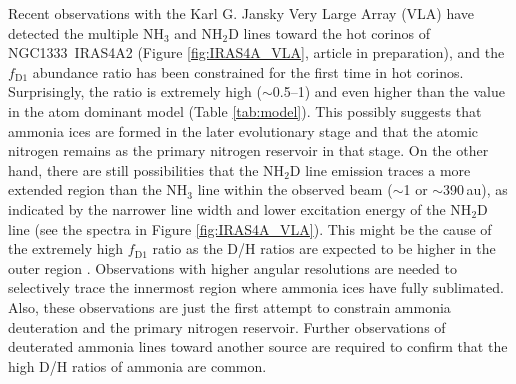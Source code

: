 \documentclass[12pt,a4paper]{article}  %
\newcommand{\ammonia}{NH$_3$\xspace}
\begin{document}
Recent observations with the Karl G. Jansky Very Large Array (VLA) have detected the multiple \ammonia and NH$_2$D lines toward the hot corinos of NGC1333~IRAS4A2 (Figure \ref{fig:IRAS4A_VLA}, article in preparation), and the $f_\mathrm{D1}$ abundance ratio has been constrained for the first time in hot corinos. Surprisingly, the ratio is extremely high ($\sim$0.5--1) and even higher than the value in the atom dominant model (Table \ref{tab:model}). This possibly suggests that ammonia ices are formed in the later evolutionary stage and that the atomic nitrogen remains as the primary nitrogen reservoir in that stage. On the other hand, there are still possibilities that the NH$_2$D line emission traces a more extended region than the NH$_3$ line within the observed beam ($\sim$1 or $\sim$390\,au), as indicated by the narrower line width and lower excitation energy of the NH$_2$D line (see the spectra in Figure \ref{fig:IRAS4A_VLA}). This might be the cause of the extremely high $f_\mathrm{D1}$ ratio as the D/H ratios are expected to be higher in the outer region \citep{Furuya18}. Observations with higher angular resolutions are needed to selectively trace the innermost region where ammonia ices have fully sublimated. Also, these observations are just the first attempt to constrain ammonia deuteration and the primary nitrogen reservoir. Further observations of deuterated ammonia lines toward another source are required to confirm that the high D/H ratios of ammonia are common. 





\end{document}
